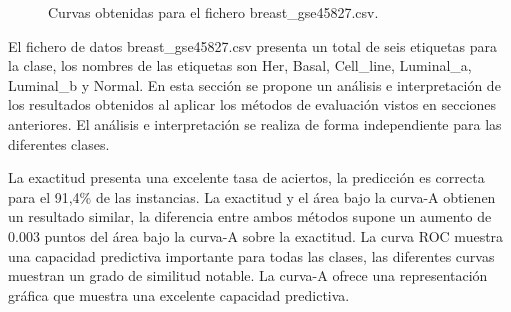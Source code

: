 \bigbreak

\begin{figure}[htp]
    \centering
    \caption{Curvas obtenidas para el fichero breast\_gse45827.csv.}
    \label{fig:11}
\end{figure}

\bigbreak

El fichero de datos breast\_gse45827.csv presenta un total de seis etiquetas para la clase, los nombres de las etiquetas son Her, Basal, Cell\_line, Luminal\_a, Luminal\_b y Normal. En esta sección se propone un análisis e interpretación de los resultados obtenidos al aplicar los métodos de evaluación vistos en secciones anteriores. El análisis e interpretación se realiza de forma independiente para las diferentes clases.

\bigbreak

La exactitud presenta una excelente tasa de aciertos, la predicción es correcta para el 91,4\% de las instancias. La exactitud y el área bajo la curva-A obtienen un resultado similar, la diferencia entre ambos métodos supone un aumento de $0.003$ puntos del área bajo la curva-A sobre la exactitud. La curva ROC muestra una capacidad predictiva importante para todas las clases, las diferentes curvas muestran un grado de similitud notable. La curva-A ofrece una representación gráfica que muestra una excelente capacidad predictiva.

\bigbreak

